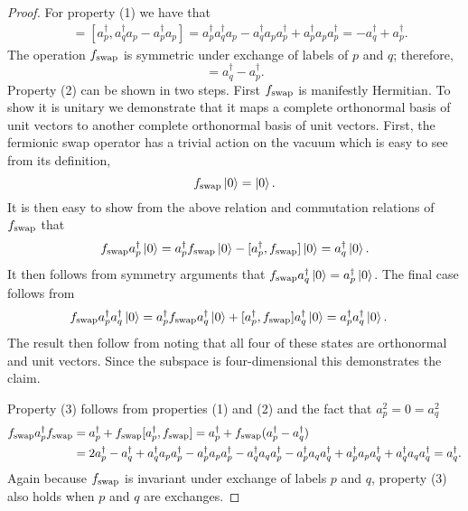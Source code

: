 \documentclass[superscriptaddress,aps,pra,nofootinbib,notitlepage,10pt,longbibliography]{revtex4-1}
\def\ket#1{\mathinner{|{#1}\rangle}}
\begin{document}
\begin{proof}
For property (1) we have that
\begin{align}
[a_p^\dagger,f_{\rm swap}]&=[a_p^\dagger,a_q^\dagger a_p -a_p^\dagger a_p]=a_p^\dagger a_q^\dagger a_p -a_q^\dagger a_pa_p^\dagger +a_p^\dagger a_p a_p^\dagger =-a_q^\dagger+a_p^\dagger.
\end{align}
The operation $f_{\rm swap}$ is symmetric under exchange of labels of $p$ and $q$; therefore,
\begin{equation}
[a_q^\dagger,f_{\rm swap}]=a_q^\dagger -a_p^\dagger.
\end{equation}
Property (2) can be shown in two steps.  First $f_{\rm swap}$ is manifestly Hermitian.  To show it is unitary we demonstrate that it maps a complete orthonormal basis of unit vectors to another complete orthonormal basis of unit vectors.
First, the fermionic swap operator has a trivial action on the vacuum which is easy to see from its definition,
\begin{equation}
f_{\rm swap}\ket{0}= \ket{0}.
\end{equation}
It is then easy to show from the above relation and commutation relations of $f_{\rm swap}$ that
\begin{align}
f_{\rm swap}a_p^\dagger \ket{0} = a_p^{\dagger}f_{\rm swap}\ket{0}-[a_p^\dagger,f_{\rm swap}]\ket{0} = a_q^\dagger \ket{0}.
\end{align}
It then follows from symmetry arguments that $f_{\rm swap} a_q^\dagger \ket{0}=a_p^\dagger \ket{0}$.  The final case follows from
\begin{align}
f_{\rm swap}a_p^\dagger a_q^\dagger \ket{0} &= a_p^\dagger f_{\rm swap}a_q^\dagger\ket{0}+[a_p^\dagger,f_{\rm swap}]a_q^\dagger\ket{0}=a_p^\dagger a_q^\dagger \ket{0}.
\end{align}
The result then follow from noting that all four of these states are orthonormal and unit vectors. Since the subspace is four-dimensional this demonstrates the claim.

Property (3) follows from properties (1) and (2) and the fact that $a_p^2 =0 =a_q^2$
\begin{align}
f_{\rm swap}a_p^\dagger f_{\rm swap} &= a_p^\dagger +f_{\rm swap}[a_p^\dagger,f_{\rm swap}]=a_p^\dagger +f_{\rm swap}(a_p^\dagger -a_q^\dagger) \\
%
&=2a_p^\dagger -a_q^\dagger +a_q^\dagger a_p a_p^\dagger -a_p^\dagger a_p a_p^\dagger -a_q^\dagger a_q a_p^\dagger -a_p^\dagger a_q a_q^\dagger + a_p^\dagger a_p a_q^\dagger +a_q^\dagger a_q a_q^\dagger =a_q^\dagger.\nonumber
\end{align}
Again because $f_{\rm swap}$ is invariant under exchange of labels $p$ and $q$, property (3) also holds when $p$ and $q$ are exchanges.


\end{proof}
\end{document}
